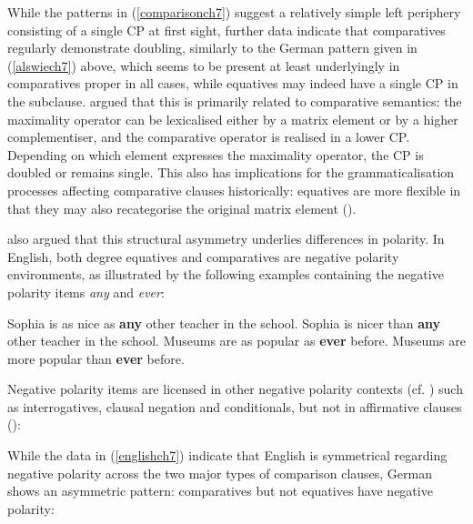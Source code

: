 While the patterns in (\ref{comparisonch7}) suggest a relatively simple left periphery consisting of a single CP at first sight, further data indicate that comparatives regularly demonstrate doubling, similarly to the German pattern given in (\ref{alswiech7}) above, which seems to be present at least underlyingly in comparatives proper in all cases, while equatives may indeed have a single CP in the subclause.  argued that this is primarily related to comparative semantics: the maximality operator can be lexicalised either by a matrix element or by a higher complementiser, and the comparative operator is realised in a lower CP. Depending on which element expresses the maximality operator, the CP is doubled or remains single. This also has implications for the grammaticalisation processes affecting comparative clauses historically: equatives are more flexible in that they may also recategorise the original matrix element (\citealt{jaeger2018}).

 also argued that this structural asymmetry underlies differences in polarity. In English, both degree equatives and comparatives are negative polarity environments, as illustrated by the following examples containing the negative polarity items \textit{any} and \textit{ever}:

\ea \label{englishch7}
\ea Sophia is as nice as \textbf{any} other teacher in the school. \label{asanych7}
\ex Sophia is nicer than \textbf{any} other teacher in the school. \label{thananych7}
\ex Museums are as popular as \textbf{ever} before. \label{aseverch7}
\ex Museums are more popular than \textbf{ever} before. \label{thaneverch7}
\z
\z

Negative polarity items are licensed in other negative polarity contexts (cf. \citealt{klima1964}) such as interrogatives, clausal negation and conditionals, but not in affirmative clauses (\citealt[531, ex. 11]{seuren1973}):

\ea
{}
\z
\z

While the data in (\ref{englishch7}) indicate that English is symmetrical regarding negative polarity across the two major types of comparison clauses, German shows an asymmetric pattern: comparatives but not equatives have negative polarity:

